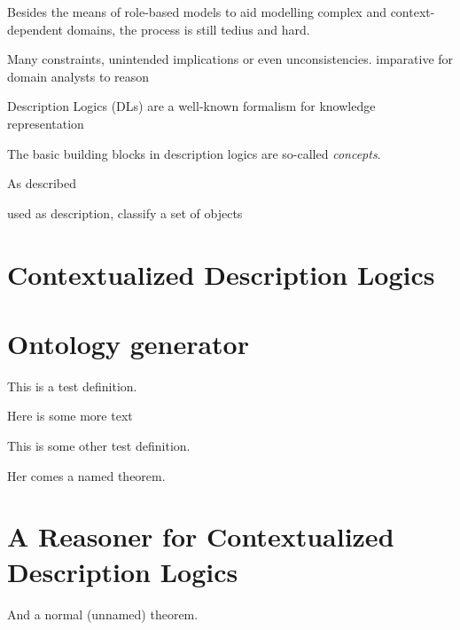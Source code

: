 Besides the means of role-based models to aid modelling complex and context-dependent
domains, the process is still tedius and hard. 

Many constraints, unintended implications or even unconsistencies. imparative for domain analysts to reason


Description Logics (DLs) are a well-known formalism for knowledge representation



The basic building blocks in description logics are so-called \emph{concepts}. 

As described

used as description, classify a set of objects

\section{Contextualized Description Logics}
\label{sec:intro-contextualized-description-logics}

\blindtext

\section{Ontology generator}
\label{sec:zweite-section}

\blindtext 

\begin{definition}
  This is a test definition.
\end{definition}

Here is some more text

\begin{definition}
  This is some other test definition.
\end{definition}

\begin{theorem*}[thmtitel]
  Her comes a named theorem.
\end{theorem*}

\section{A Reasoner for Contextualized Description Logics}
\label{sec:intro-reasoner}


\blindtext

\begin{theorem}
  And a normal (unnamed) theorem.
\end{theorem}


